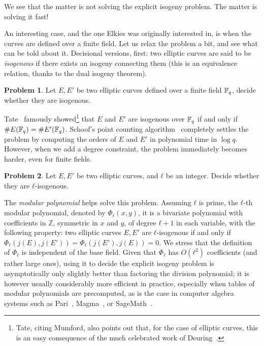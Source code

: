 \documentclass{report}
\theoremstyle{plain}
\theoremstyle{definition}
\newtheorem{problem}{Problem}
\begin{document}
We see that the matter is not solving the explicit isogeny
problem. The matter is solving it fast!

An interesting case, and the one Elkies was originally interested in,
is when the curves are defined over a finite field. %
Let us relax the problem a bit, and see what can be told about it. %
Decisional versions, first: two elliptic curves are said to be
\emph{isogenous} if there exists an isogeny connecting them (this is
an equivalence relation, thanks to the dual isogeny theorem).

\begin{problem}
  \label{prob:isogenous}
  Let $E,E'$ be two elliptic curves defined over a finite field
  $\mathbb{F}_q$, decide whether they are isogenous.
\end{problem}

Tate~\cite[Th.~1(c)]{Tate} famously showed\footnote{Tate, citing
  Mumford, also points out that, for the case of elliptic curves, this
  is an easy consequence of the much celebrated work of
  Deuring~\cite{deuring41}.} that $E$ and $E'$ are isogenous over
$\mathbb{F}_q$ if and only if $\#E(\mathbb{F}_q)=\#E'(\mathbb{F}_q)$. %
Schoof's point counting algorithm~\cite{schoof85,schoof95} completely
settles the problem by computing the orders of $E$ and $E'$ in
polynomial time in $\log q$. %
However, when we add a degree constraint, the problem immediately
becomes harder, even for finite fields. %

\begin{problem}
  \label{prob:ell-isogenous}
  Let $E,E'$ be two elliptic curves, and $ℓ$ be an integer. Decide
  whether they are $ℓ$-isogenous.
\end{problem}

The \emph{modular polynomial} helps solve this problem. %
Assuming $ℓ$ is prime, the $ℓ$-th modular polynomial, denoted by
$Φ_ℓ(x,y)$, it is a bivariate polynomial with coefficients in $ℤ$,
symmetric in $x$ and $y$, of degree $ℓ+1$ in each variable, with the
following property: two elliptic curves $E,E'$ are $ℓ$-isogenous if
and only if $Φ_ℓ(j(E),j(E'))=Φ_ℓ(j(E'),j(E))=0$. %
We stress that the definition of $Φ_ℓ$ is independent of the base
field. %
Given that $Φ_ℓ$ has $O(ℓ^2)$ coefficients (and rather large ones),
using it to decide the explicit isogeny problem is asymptotically only
slightly better than factoring the division polynomial; it is however
usually considerably more efficient in practice, especially when
tables of modular polynomials are precomputed, as is the case in
computer algebra systems such as Pari~\cite{Pari}, Magma~\cite{MAGMA},
or SageMath~\cite{Sage}. %
\end{document}
